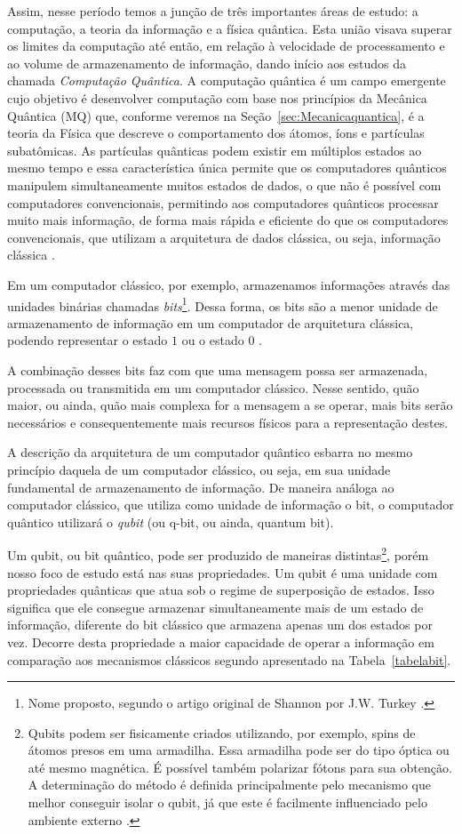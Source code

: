 Assim, nesse período temos a junção de três importantes áreas de estudo: a computação, a teoria da informação e a física quântica. Esta união visava superar os limites da computação até então, em relação à velocidade de processamento e ao volume de armazenamento de informação, dando início aos estudos da chamada \textit{Computação Quântica}. A computação quântica é um campo emergente cujo objetivo é desenvolver computação com base nos princípios da Mecânica Quântica (MQ) que, conforme veremos na Seção~\ref{sec:Mecanicaquantica}, é a teoria da Física que descreve o comportamento dos átomos, íons e partículas subatômicas. As partículas quânticas podem existir em múltiplos estados ao mesmo tempo e essa característica única permite que os computadores quânticos manipulem simultaneamente muitos estados de dados, o que não é possível com computadores convencionais, permitindo aos computadores quânticos processar muito mais informação, de forma mais rápida e eficiente do que os computadores convencionais, que utilizam a arquitetura de dados clássica, ou seja, informação clássica \cite{CompInfoQuantica}.

Em um computador clássico, por exemplo, armazenamos informações através das unidades binárias chamadas \textit{bits}\footnote{Nome proposto, segundo o artigo original de Shannon por J.W. Turkey \cite{MTC}.}. Dessa forma, os bits são a menor unidade de armazenamento de informação em um computador de arquitetura clássica, podendo representar o estado \(1\) ou o estado \(0\) \cite{MTC}.

A combinação desses bits faz com que uma mensagem possa ser armazenada, processada ou transmitida em um computador clássico. Nesse sentido, quão maior, ou ainda, quão mais complexa for a mensagem a se operar, mais bits serão necessários e consequentemente mais recursos físicos para a representação destes.

A descrição da arquitetura de um computador quântico esbarra no mesmo princípio daquela de um computador clássico, ou seja, em sua unidade fundamental de armazenamento de informação. De maneira análoga ao computador clássico, que utiliza como unidade de informação o bit, o computador quântico utilizará o \textit{qubit} (ou q-bit, ou ainda, quantum bit).

Um qubit, ou bit quântico, pode ser produzido de maneiras distintas\footnote{Qubits podem ser fisicamente criados utilizando, por exemplo, spins de átomos presos em uma armadilha. Essa armadilha pode ser do tipo óptica ou até mesmo magnética. É possível também polarizar fótons para sua obtenção. A determinação do método é definida principalmente pelo mecanismo que melhor conseguir isolar o qubit, já que este é facilmente influenciado pelo ambiente externo \cite{materialdidaticomecquantica}.}, porém nosso foco de estudo está nas suas propriedades. Um qubit é uma unidade com propriedades quânticas que atua sob o regime de superposição de estados. Isso significa que ele consegue armazenar simultaneamente mais de um estado de informação, diferente do bit clássico que armazena apenas um dos estados por vez. Decorre desta propriedade a maior capacidade de operar a informação em comparação aos mecanismos clássicos segundo apresentado na Tabela~\ref{tabelabit}.


